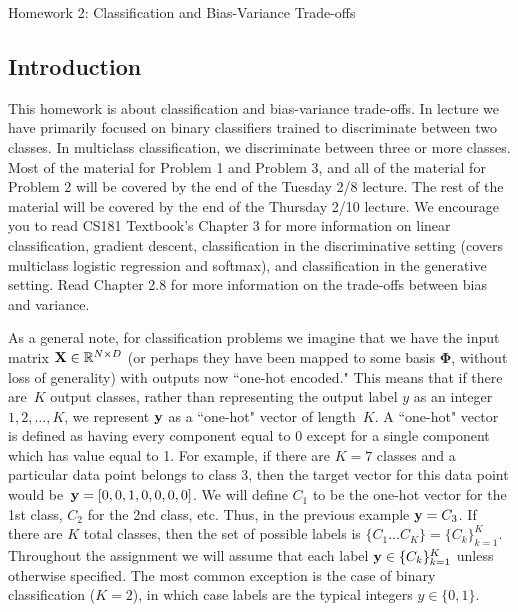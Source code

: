 \documentclass[submit]{harvardml}
\begin{document}
\begin{center}
{\Large Homework 2: Classification and Bias-Variance Trade-offs}\\
\end{center}

\subsection*{Introduction}

This homework is about classification and bias-variance trade-offs. In
lecture we have primarily focused on binary classifiers trained to
discriminate between two classes. In multiclass classification, we
discriminate between three or more classes.  Most of the material for Problem 1 and Problem 3, and all of the material for Problem 2 will be covered by the end of the Tuesday 2/8 lecture. The rest of the material will be covered by the end of the Thursday 2/10 lecture.  We encourage you to read
CS181 Textbook's Chapter 3 for more information on linear
classification, gradient descent, classification in the discriminative
setting (covers multiclass logistic regression and softmax), and
classification in the generative setting. Read Chapter 2.8 for more
information on the trade-offs between bias and variance.

As a general note, for classification problems we imagine that we have
the input matrix $\mathbf{X} \in \mathbb{R}^{N \times D}$ (or perhaps they
have been mapped to some basis $\bm{\Phi}$, without loss of
generality) with outputs now ``one-hot encoded."  This means that if
there are~$K$ output classes, rather than representing the output
label $y$ as an integer~${1,2,\ldots,K}$, we represent $\mathbf{y}$ as a
``one-hot" vector of length~$K$. A ``one-hot" vector is defined as
having every component equal to 0 except for a single component which
has value equal to 1.  For example, if there are $K = 7$ classes and a
particular data point belongs to class 3, then the target vector for
this data point would be~$\mathbf{y} = [0,0,1,0,0,0,0]$.  We will define
$C_1$ to be the one-hot vector for the 1st class, $C_2$ for the 2nd
class, etc.  Thus, in the previous example $\mathbf{y} = C_3$. If there
are $K$ total classes, then the set of possible labels is $\{C_1
\ldots C_K \} = \{C_k\}_{k=1}^K$.  Throughout the assignment we will
assume that each label $\mathbf{y} \in \{C_k\}_{k=1}^K$ unless otherwise
specified. The most common exception is the case of binary classification
($K = 2$), in which case labels are the typical integers $y \in \{0, 1\}$.\\
\end{document}
